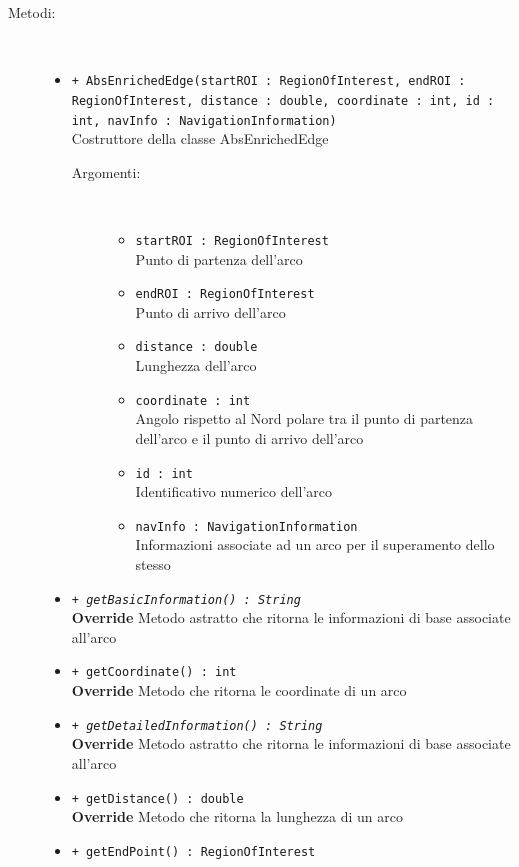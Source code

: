 \documentclass[../DefinizioneDiProdotto.tex]{subfiles}
\begin{document}
\begin{description}
\begin{itemize}
\end{itemize}
\item[Metodi:] \
\begin{itemize}
\item \texttt{+ AbsEnrichedEdge(startROI : RegionOfInterest, endROI : RegionOfInterest, distance : double, coordinate : int, id : int, navInfo : NavigationInformation)}\\
Costruttore della classe AbsEnrichedEdge
 \begin{description}
\item[Argomenti:] \
\begin{itemize}
\item \texttt{startROI : RegionOfInterest}\\
Punto di partenza dell'arco\item \texttt{endROI : RegionOfInterest}\\
Punto di arrivo dell'arco\item \texttt{distance : double}\\
Lunghezza dell'arco\item \texttt{coordinate : int}\\
Angolo rispetto al Nord polare tra il punto di partenza dell'arco e il punto di arrivo dell'arco\item \texttt{id : int}\\
Identificativo numerico dell'arco\item \texttt{navInfo : NavigationInformation}\\
Informazioni associate ad un arco per il superamento dello stesso\end{itemize}
\end{description}
\item \texttt{+ \textit{getBasicInformation() : String}}\\
\textbf{Override} Metodo astratto che ritorna le informazioni di base associate all'arco
 \item \texttt{+ getCoordinate() : int}\\
\textbf{Override} Metodo che ritorna le coordinate di un arco
 \item \texttt{+ \textit{getDetailedInformation() : String}}\\
\textbf{Override} Metodo astratto che ritorna le informazioni di base associate all'arco
 \item \texttt{+ getDistance() : double}\\
\textbf{Override} Metodo che ritorna la lunghezza di un arco
 \item \texttt{+ getEndPoint() : RegionOfInterest}\\

\end{itemize}
\end{description}
\end{document}
